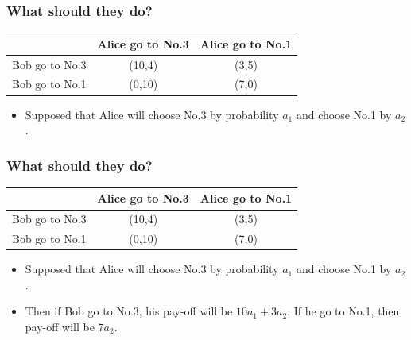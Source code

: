 \documentclass{beamer}
\begin{document}
\begin{frame}
\frametitle{What should they do?}
\begin{tabular}{|c|c|c|}
\hline
\hline
    & {\color{red}Alice} go to No.3 & {\color{red}Alice} go to No.1\\
\hline
{\color{blue}Bob} go to No.3 & ({\color{blue}10},{\color{red}4}) & ({\color{blue}3},{\color{red}5})\\
\hline
{\color{blue}Bob} go to No.1 & ({\color{blue}0},{\color{red}10}) & ({\color{blue}7},{\color{red}0})\\
\hline
\hline
\end{tabular}
\begin{itemize}
\item Supposed that Alice will choose No.3 by probability $a_1$ and choose No.1 by $a_2$.
\end{itemize}
\end{frame}

\begin{frame}
\frametitle{What should they do?}
\begin{tabular}{|c|c|c|}
\hline
\hline
    & {\color{red}Alice} go to No.3 & {\color{red}Alice} go to No.1\\
\hline
{\color{blue}Bob} go to No.3 & ({\color{blue}10},{\color{red}4}) & ({\color{blue}3},{\color{red}5})\\
\hline
{\color{blue}Bob} go to No.1 & ({\color{blue}0},{\color{red}10}) & ({\color{blue}7},{\color{red}0})\\
\hline
\hline
\end{tabular}
\begin{itemize}
\item Supposed that Alice will choose No.3 by probability $a_1$ and choose No.1 by $a_2$.
\item Then if Bob go to No.3, his pay-off will be $10a_1+3a_2$. If he go to No.1, then pay-off will be $7a_2$.
\end{itemize}
\end{frame}
\end{document}

